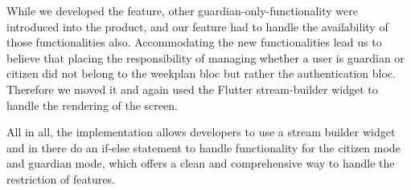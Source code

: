 While we developed the feature, other guardian-only-functionality were introduced into the product, and our feature had to handle the availability of those functionalities also. Accommodating the new functionalities lead us to believe that placing the responsibility of managing whether a user is guardian or citizen did not belong to the weekplan \gls{bloc} but rather the authentication \gls{bloc}. Therefore we moved it and again used the Flutter stream-builder widget to handle the rendering of the screen.

All in all, the implementation allows developers to use a stream builder widget and in there do an if-else statement to handle functionality for the citizen mode and guardian mode, which offers a clean and comprehensive way to handle the restriction of features.
